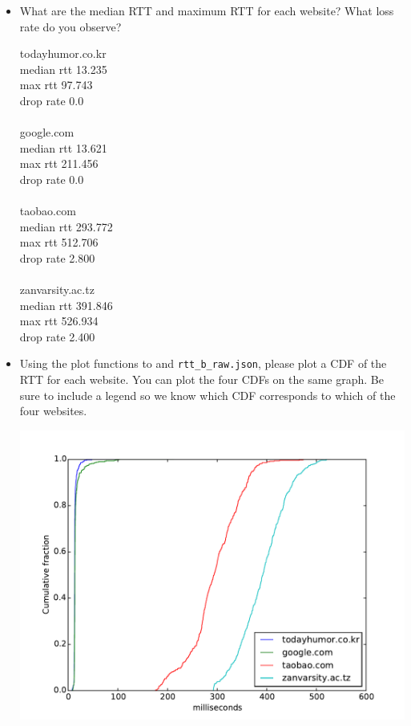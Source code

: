 \documentclass[10pt]{article}
\begin{document}
\begin{enumerate}
\begin{itemize}
\item What are the median RTT and maximum RTT for each website? What loss rate do you observe?

todayhumor.co.kr \\
median rtt 13.235 \\
max rtt 97.743 \\
drop rate 0.0 \\
\\
google.com \\
median rtt 13.621 \\
max rtt 211.456 \\
drop rate 0.0 \\
\\
taobao.com \\
median rtt 293.772 \\
max rtt 512.706 \\
drop rate 2.800 \\
\\
zanvarsity.ac.tz \\
median rtt 391.846 \\
max rtt 526.934 \\
drop rate 2.400

\item Using the plot functions to and \texttt{rtt\_b\_raw.json}, please plot a CDF of the RTT for each website. You can plot the four CDFs on the same graph. Be sure to include a legend so we know which CDF corresponds to which of the four websites.

\includegraphics[scale=0.5]{plot_ping.pdf}

\end{itemize}


\end{enumerate}
\end{document}
